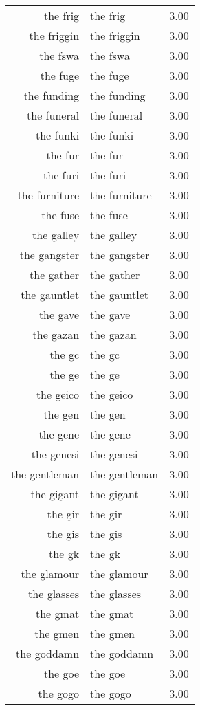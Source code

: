 \begin{table}[ht]
\begin{tabular}{rlr}
  the frig & the frig & 3.00 \\ 
  the friggin & the friggin & 3.00 \\ 
  the fswa & the fswa & 3.00 \\ 
  the fuge & the fuge & 3.00 \\ 
  the funding & the funding & 3.00 \\ 
  the funeral & the funeral & 3.00 \\ 
  the funki & the funki & 3.00 \\ 
  the fur & the fur & 3.00 \\ 
  the furi & the furi & 3.00 \\ 
  the furniture & the furniture & 3.00 \\ 
  the fuse & the fuse & 3.00 \\ 
  the galley & the galley & 3.00 \\ 
  the gangster & the gangster & 3.00 \\ 
  the gather & the gather & 3.00 \\ 
  the gauntlet & the gauntlet & 3.00 \\ 
  the gave & the gave & 3.00 \\ 
  the gazan & the gazan & 3.00 \\ 
  the gc & the gc & 3.00 \\ 
  the ge & the ge & 3.00 \\ 
  the geico & the geico & 3.00 \\ 
  the gen & the gen & 3.00 \\ 
  the gene & the gene & 3.00 \\ 
  the genesi & the genesi & 3.00 \\ 
  the gentleman & the gentleman & 3.00 \\ 
  the gigant & the gigant & 3.00 \\ 
  the gir & the gir & 3.00 \\ 
  the gis & the gis & 3.00 \\ 
  the gk & the gk & 3.00 \\ 
  the glamour & the glamour & 3.00 \\ 
  the glasses & the glasses & 3.00 \\ 
  the gmat & the gmat & 3.00 \\ 
  the gmen & the gmen & 3.00 \\ 
  the goddamn & the goddamn & 3.00 \\ 
  the goe & the goe & 3.00 \\ 
  the gogo & the gogo & 3.00 \\ 

\end{tabular}
\end{table}
